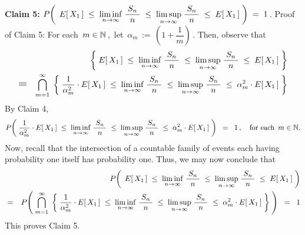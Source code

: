 \begin{enumerate}
\vskip 0.8cm
\noindent
\textbf{Claim 5:}\quad\quad
$P\!\left(\;\,
	E[\,X_{1}\,]
	\;\leq\;
		\underset{n\rightarrow\infty}{\liminf}\;
		\dfrac{{\color{white}.}S_{n}{\color{white}.}}{n}
	\;\leq\;
		\underset{n\rightarrow\infty}{\limsup}\;
		\dfrac{{\color{white}.}S_{n}{\color{white}.}}{n}
	\;\leq\;
		E[\,X_{1}\,]
	\;\right)
\;=\;1$\,.
\vskip 0.3cm
\noindent
Proof of Claim 5:\quad
For each \,$m \in \mathbb{N}$\,,\, let \,$\alpha_{m} \,:=\, \left(1 + \dfrac{1}{m}\right)$\,.
Then, observe that
\begin{eqnarray*}
&&
	\left\{\;
		E[\,X_{1}\,]
		\;\leq\;
			\underset{n\rightarrow\infty}{\liminf}\;
			\dfrac{{\color{white}.}S_{n}{\color{white}.}}{n}
		\;\leq\;
			\underset{n\rightarrow\infty}{\limsup}\;
			\dfrac{{\color{white}.}S_{n}{\color{white}.}}{n}
		\;\leq\;
			E[\,X_{1}\,]
		\;\right\}
\\
& \textnormal{\Large$=$} &
	\overset{\infty}{\underset{m=1}{\bigcap}}\;
	\left\{\;
		\dfrac{1}{\alpha_{m}^{2}} \cdot E[\,X_{1}\,]
		\;\leq\;
			\underset{n\rightarrow\infty}{\liminf}\;
			\dfrac{{\color{white}.}S_{n}{\color{white}.}}{n}
		\;\leq\;
			\underset{n\rightarrow\infty}{\limsup}\;
			\dfrac{{\color{white}.}S_{n}{\color{white}.}}{n}
		\;\leq\;
			\alpha_{m}^{2} \cdot E[\,X_{1}\,]
		\;\right\}
\end{eqnarray*}
By Claim 4,
\begin{equation*}
P\!\left(\;
	\dfrac{1}{\alpha_{m}^{2}} \cdot E[\,X_{1}\,]
	\;\leq\;
		\underset{n\rightarrow\infty}{\liminf}\;
		\dfrac{{\color{white}.}S_{n}{\color{white}.}}{n}
	\;\leq\;
		\underset{n\rightarrow\infty}{\limsup}\;
		\dfrac{{\color{white}.}S_{n}{\color{white}.}}{n}
	\;\leq\;
		\alpha_{m}^{2} \cdot E[\,X_{1}\,]
	\;\right)
\;\; = \;\;
	1\,,
\quad
\textnormal{for each \,$m \in \N$}.
\end{equation*}
Now, recall that the intersection of a countable family of events each having probability one itself has probability one.
Thus, we may now conclude that
\begin{eqnarray*}
&&
	P\!\left(\;\,
		E[\,X_{1}\,]
		\;\leq\;
			\underset{n\rightarrow\infty}{\liminf}\;
			\dfrac{{\color{white}.}S_{n}{\color{white}.}}{n}
		\;\leq\;
			\underset{n\rightarrow\infty}{\limsup}\;
			\dfrac{{\color{white}.}S_{n}{\color{white}.}}{n}
		\;\leq\;
			E[\,X_{1}\,]
		\;\right)
\\
& = &
	P\!\left(\;
		\overset{\infty}{\underset{m=1}{\bigcap}}\;
		\left\{\;
			\dfrac{1}{\alpha_{m}^{2}} \cdot E[\,X_{1}\,]
			\;\leq\;
				\underset{n\rightarrow\infty}{\liminf}\;
				\dfrac{{\color{white}.}S_{n}{\color{white}.}}{n}
			\;\leq\;
				\underset{n\rightarrow\infty}{\limsup}\;
				\dfrac{{\color{white}.}S_{n}{\color{white}.}}{n}
			\;\leq\;
				\alpha_{m}^{2} \cdot E[\,X_{1}\,]
			\;\right\}
		\;\right)
\;\; = \;\;
	1
\end{eqnarray*}
This proves Claim 5.


\end{enumerate}
